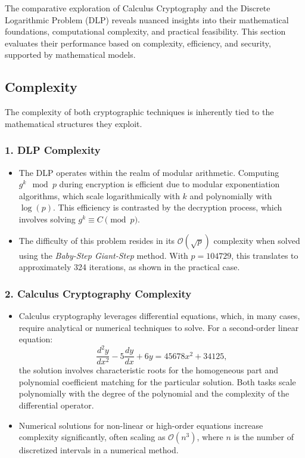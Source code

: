 \documentclass[12pt]{article}
\begin{document}
The comparative exploration of Calculus Cryptography and the Discrete Logarithmic Problem (DLP) reveals nuanced insights into their mathematical foundations, computational complexity, and practical feasibility. This section evaluates their performance based on complexity, efficiency, and security, supported by mathematical models.

\subsection*{Complexity}

The complexity of both cryptographic techniques is inherently tied to the mathematical structures they exploit.

\subsubsection*{1. DLP Complexity}
\begin{itemize}
    \item The DLP operates within the realm of modular arithmetic. Computing \( g^k \mod p \) during encryption is efficient due to modular exponentiation algorithms, which scale logarithmically with \( k \) and polynomially with \( \log(p) \). This efficiency is contrasted by the decryption process, which involves solving \( g^k \equiv C \pmod{p} \).
    \item The difficulty of this problem resides in its \( \mathcal{O}(\sqrt{p}) \) complexity when solved using the \textit{Baby-Step Giant-Step} method. With \( p = 104729 \), this translates to approximately 324 iterations, as shown in the practical case.
\end{itemize}

\subsubsection*{2. Calculus Cryptography Complexity}
\begin{itemize}
    \item Calculus cryptography leverages differential equations, which, in many cases, require analytical or numerical techniques to solve. For a second-order linear equation:
    \[
    \frac{d^2y}{dx^2} - 5\frac{dy}{dx} + 6y = 45678x^2 + 34125,
    \]
    the solution involves characteristic roots for the homogeneous part and polynomial coefficient matching for the particular solution. Both tasks scale polynomially with the degree of the polynomial and the complexity of the differential operator.
    \item Numerical solutions for non-linear or high-order equations increase complexity significantly, often scaling as \( \mathcal{O}(n^3) \), where \( n \) is the number of discretized intervals in a numerical method.
\end{itemize}
\end{document}
